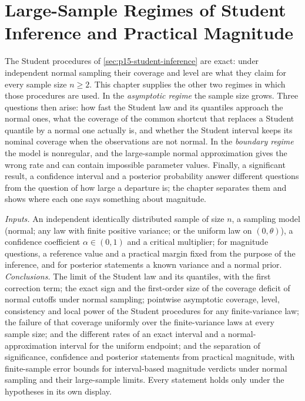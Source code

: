 \chapter{Large-Sample Regimes of Student Inference and Practical Magnitude}
\label{sec:p15-w02b-p15-059}

The Student procedures of \cref{sec:p15-student-inference} are exact: under
independent normal sampling their coverage and level are what they claim for
every sample size \(n\geq2\). This chapter supplies the other two regimes in
which those procedures are used. In the \emph{asymptotic regime} the sample
size grows. Three questions then arise: how fast the Student law and its
quantiles approach the normal ones, what the coverage of the common shortcut
that replaces a Student quantile by a normal one actually is, and whether the
Student interval keeps its nominal coverage when the observations are not
normal. In the \emph{boundary regime} the model is nonregular, and the
large-sample normal approximation gives the wrong rate and can contain
impossible parameter values. Finally, a significant result, a confidence
interval and a posterior probability answer different questions from the
question of how large a departure is; the chapter separates them and shows
where each one says something about magnitude.

\emph{Inputs.} An independent identically distributed sample of size \(n\),
a sampling model (normal; any law with finite positive variance; or the
uniform law on \((0,\theta)\)), a confidence coefficient \(\alpha\in(0,1)\)
and a critical multiplier; for magnitude questions, a reference value and a
practical margin fixed from the purpose of the inference, and for posterior
statements a known variance and a normal prior. \emph{Conclusions.} The limit of the Student law
and its quantiles, with the first correction term; the exact sign and the
first-order size of the coverage deficit of normal cutoffs under normal
sampling; pointwise asymptotic coverage, level, consistency and local power
of the Student procedures for any finite-variance law; the failure of that
coverage uniformly over the finite-variance laws at every sample size; and
the different rates of an exact interval and a normal-approximation interval
for the uniform endpoint; and the separation of significance, confidence
and posterior statements from practical magnitude, with finite-sample error
bounds for interval-based magnitude verdicts under normal sampling and their
large-sample limits. Every statement holds only under the hypotheses in
its own display.

